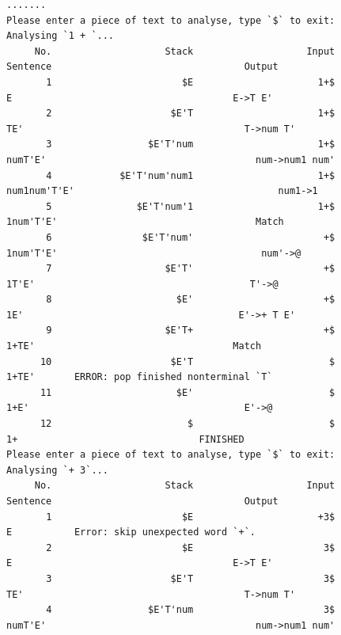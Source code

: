 \documentclass[UTF8]{ctexart}
\begin{document}
\begin{lstlisting}
.......
Please enter a piece of text to analyse, type `$` to exit:
Analysing `1 + `...
     No.                    Stack                    Input                      Sentence                                  Output
       1                       $E                      1+$                              E                                       E->T E'
       2                     $E'T                      1+$                              TE'                                       T->num T'
       3                 $E'T'num                      1+$                              numT'E'                                     num->num1 num'
       4            $E'T'num'num1                      1+$                              num1num'T'E'                                    num1->1
       5               $E'T'num'1                      1+$                              1num'T'E'                                   Match
       6                $E'T'num'                       +$                             1num'T'E'                                    num'->@
       7                    $E'T'                       +$                             1T'E'                                      T'->@
       8                      $E'                       +$                             1E'                                      E'->+ T E'
       9                    $E'T+                       +$                             1+TE'                                   Match
      10                     $E'T                        $                            1+TE'       ERROR: pop finished nonterminal `T`
      11                      $E'                        $                            1+E'                                      E'->@
      12                        $                        $                            1+                                FINISHED
Please enter a piece of text to analyse, type `$` to exit:
Analysing `+ 3`...
     No.                    Stack                    Input                      Sentence                                  Output
       1                       $E                      +3$                              E           Error: skip unexpected word `+`.
       2                       $E                       3$                              E                                       E->T E'
       3                     $E'T                       3$                              TE'                                       T->num T'
       4                 $E'T'num                       3$                              numT'E'                                     num->num1 num'

\end{lstlisting}
\end{document}
